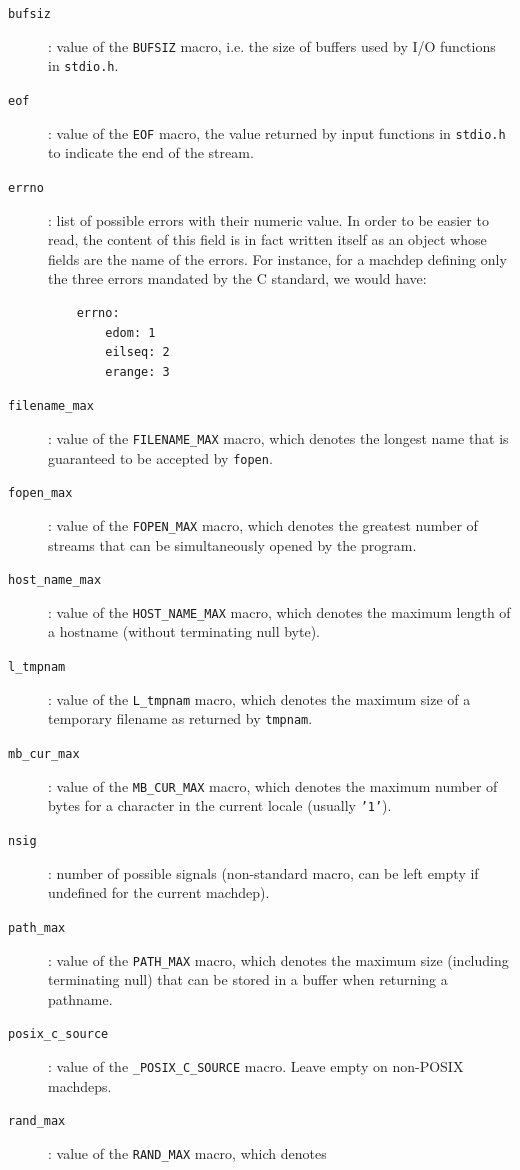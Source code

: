 \begin{description}
  \item[\texttt{bufsiz}]: value of the \texttt{BUFSIZ} macro, i.e. the size
    of buffers used by I/O functions in \texttt{stdio.h}.
  \item[\texttt{eof}]: value of the \texttt{EOF} macro, the value returned by input
    functions in \texttt{stdio.h} to indicate the end of the stream.
  \item[\texttt{errno}]: list of possible errors with their numeric value. In order
    to be easier to read, the content of this field is in fact written itself as an
    object whose fields are the name of the errors. For instance, for a machdep defining
    only the three errors mandated by the C standard, we would have:
    \begin{verbatim}
    errno:
        edom: 1
        eilseq: 2
        erange: 3
    \end{verbatim}
  \item[\texttt{filename\_max}]: value of the \texttt{FILENAME\_MAX} macro, which
    denotes the longest name that is guaranteed to be accepted by \texttt{fopen}.
  \item[\texttt{fopen\_max}]: value of the \texttt{FOPEN\_MAX} macro, which denotes the
    greatest number of streams that can be simultaneously opened by the program.
  \item[\texttt{host\_name\_max}]: value of the \texttt{HOST\_NAME\_MAX} macro, which
    denotes the maximum length of a hostname (without terminating null byte).
  \item[\texttt{l\_tmpnam}]: value of the \texttt{L\_tmpnam} macro, which denotes
    the maximum size of a temporary filename as returned by \texttt{tmpnam}.
  \item[\texttt{mb\_cur\_max}]: value of the \texttt{MB\_CUR\_MAX} macro, which denotes
    the maximum number of bytes for a character in the current locale (usually
    \texttt{'1'}).
  \item[\texttt{nsig}]: number of possible signals (non-standard macro, can be left
    empty if undefined for the current machdep).
  \item[\texttt{path\_max}]: value of the \texttt{PATH\_MAX} macro, which denotes
    the maximum size (including terminating null) that can be stored in a buffer
    when returning a pathname.
  \item[\texttt{posix\_c\_source}]: value of the \texttt{\_POSIX\_C\_SOURCE} macro.
    Leave empty on non-POSIX machdeps.
  \item[\texttt{rand\_max}]: value of the \texttt{RAND\_MAX} macro, which denotes

\end{description}
